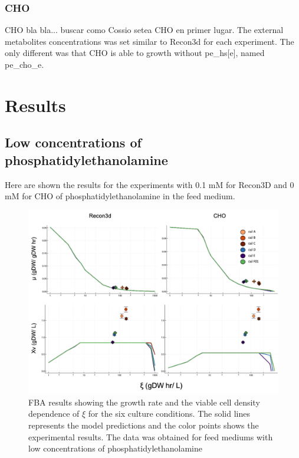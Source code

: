 \documentclass[]{article}
\begin{document}
	\subsubsection{CHO}
	
	CHO bla bla... buscar como Cossio setea CHO en primer lugar.  The external metabolites concentrations was set similar to Recon3d for each experiment. The only different was that CHO is able to growth without pe\_hs[e], named pe\_cho\_e. 
	


\section{Results} %

\subsection{Low concentrations of phosphatidylethanolamine} %

		Here are shown the results for the experiments with 0.1 mM for Recon3D and 0 mM for CHO of phosphatidylethanolamine in the feed medium.
		
	\begin{figure}[h]
		\includegraphics[scale = 0.5]{low_medium_1}
		\caption{FBA results showing the growth rate and the viable cell density dependence of $\xi$ for the six culture conditions. The solid lines represents the model predictions and the color points shows the experimental results. The data was obtained for feed mediums with low concentrations of phosphatidylethanolamine}
		
	\end{figure}
	
\end{document}
